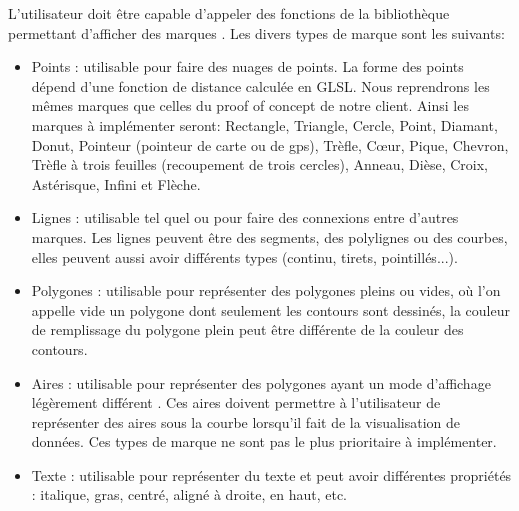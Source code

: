 \documentclass[12pt]{article}
\begin{document}
L'utilisateur doit être capable d'appeler des fonctions de la bibliothèque permettant d'afficher des
\gls{marque}s \cite{VegaMarks}. Les divers types de marque sont les suivants:
	\begin{itemize}
	\item Points : utilisable pour faire des nuages de points. La forme des points dépend d'une fonction de
    distance calculée en GLSL. Nous reprendrons les mêmes marques que celles du proof of concept de notre client.
    Ainsi les marques à implémenter seront: Rectangle, Triangle, Cercle, Point, Diamant, Donut, Pointeur (pointeur de carte ou de gps), Trèfle, Cœur, Pique, Chevron, Trèfle à trois feuilles (recoupement de trois cercles), Anneau, Dièse, Croix, Astérisque, Infini et Flèche.
    \item Lignes : utilisable tel quel ou pour faire des connexions entre d'autres marques. Les lignes
    peuvent être des segments, des polylignes ou des courbes, elles peuvent aussi avoir différents types
    (continu, tirets, pointillés...).
    \item Polygones : utilisable pour représenter des polygones pleins ou vides, où l'on appelle vide un
    polygone dont seulement les contours sont dessinés, la couleur de remplissage du polygone plein peut être
    différente de la couleur des contours.
    \item Aires : utilisable pour représenter des polygones ayant un mode d'affichage légèrement différent
    \cite{VegaMarks}. Ces aires doivent permettre à l'utilisateur de représenter des aires sous la courbe lorsqu'il fait de la
    visualisation de données. Ces types de marque ne sont pas le plus prioritaire à implémenter.
    \item Texte : utilisable pour représenter du texte et peut avoir différentes propriétés : italique,
    gras, centré, aligné à droite, en haut, etc.
    \end{itemize}
\end{document}
